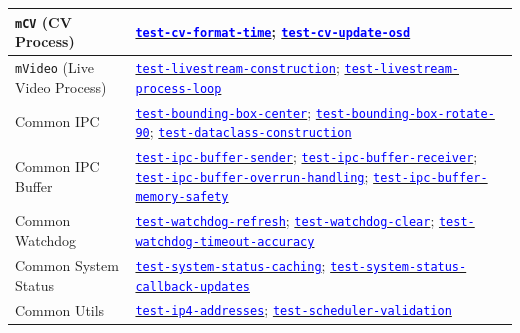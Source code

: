 \documentclass[12pt, titlepage]{article}
\newcommand{\mref}[1]{\texttt{#1}}
\newcommand{\tid}[1]{\hyperlink{tid:#1}{\textcolor{blue}{\texttt{#1}}}}
\begin{document}
\begin{longtable}{|p{4.5cm}|p{10cm}|}
  \hline
  \mref{mCV} (CV Process)                            & \tid{test-cv-format-time}; \tid{test-cv-update-osd}                                                                                                                                                                                                                                       \\
  \hline
  \mref{mVideo} (Live Video Process)                 & \tid{test-livestream-construction}; \tid{test-livestream-process-loop}                                                                                                                                                                                                                    \\
  \hline
  Common IPC                                         & \tid{test-bounding-box-center}; \tid{test-bounding-box-rotate-90}; \tid{test-dataclass-construction}                                                                                                                                                                                      \\
  \hline
  Common IPC Buffer                                  & \tid{test-ipc-buffer-sender}; \tid{test-ipc-buffer-receiver}; \tid{test-ipc-buffer-overrun-handling}; \tid{test-ipc-buffer-memory-safety}                                                                                                                                                 \\
  \hline
  Common Watchdog                                    & \tid{test-watchdog-refresh}; \tid{test-watchdog-clear}; \tid{test-watchdog-timeout-accuracy}                                                                                                                                                                                              \\
  \hline
  Common System Status                               & \tid{test-system-status-caching}; \tid{test-system-status-callback-updates}                                                                                                                                                                                                               \\
  \hline
  Common Utils                                       & \tid{test-ip4-addresses}; \tid{test-scheduler-validation}                                                                                                                                                                                                                                 \\

\end{longtable}
\end{document}
